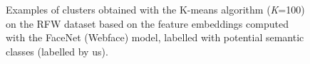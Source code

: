 \begin{figure}[h]
    \caption{Examples of clusters obtained with the K-means algorithm (\textit{K}=100) on the RFW dataset based on the feature embeddings computed with the FaceNet (Webface) model, labelled with potential semantic classes (labelled by us).}
  \label{fig:embeddingsKMeans}
\end{figure}

